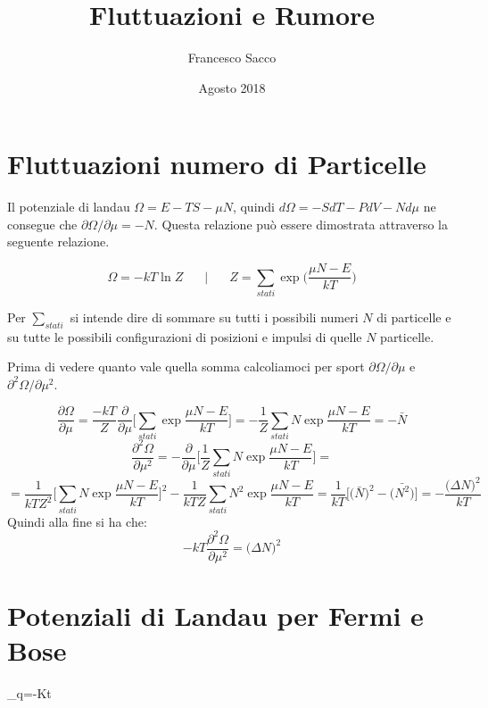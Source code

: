 \documentclass[10pt,a4paper]{article}
\author{Francesco Sacco}
\title{Fluttuazioni e Rumore}
\newcommand{\exn}{\phantom{xxx}}
\begin{document}
\date{Agosto 2018}
\maketitle

\section{Fluttuazioni numero di Particelle}
	Il potenziale di landau $\Omega=E-TS-\mu N$, quindi $d\Omega=-SdT-PdV-Nd\mu$ ne consegue che $\partial \Omega/\partial \mu=-N$. Questa relazione può essere dimostrata attraverso la seguente relazione.

	\begin{equation}
		\Omega=-kT\ln Z\exn|\exn Z=\sum_{stati}\exp\bigg(\frac{\mu N -E}{kT}\bigg)
	\end{equation}

	Per $\sum_{stati}$ si intende dire di sommare su tutti i possibili numeri $N$ di particelle e su tutte le possibili configurazioni di posizioni e impulsi di quelle $N$ particelle.\newline

	Prima di vedere quanto vale quella somma calcoliamoci per sport $\partial \Omega/\partial \mu$ e $\partial^2 \Omega/\partial \mu^2$.

	\[
		\frac{\partial \Omega}{\partial \mu}=\frac{-kT}{Z}\frac{\partial}{\partial \mu}
		\bigg[\sum_{stati}\exp\frac{\mu N -E}{kT}\bigg]=-\frac1Z \sum_{stati}N\exp\frac{\mu N -E}{kT}=-\bar N
	\]\newline\newline
	\[
		\frac{\partial^2 \Omega}{\partial \mu^2}=
		-\frac{\partial}{\partial \mu}\bigg[\frac1Z \sum_{stati}N\exp\frac{\mu N -E}{kT}\bigg]=
	\]
	\[
		=\frac1{kTZ^2}\bigg[\sum_{stati}N\exp\frac{\mu N -E}{kT}\bigg]^2-\frac1{kTZ}\sum_{stati}N^2\exp\frac{\mu N -E}{kT}=\frac1{kT}\bigg[\big(\bar N\big)^2-\bar{\big(N^2\big)}\bigg]=-\frac{\big(\Delta N\big)^2}{kT}
	\]
	Quindi alla fine si ha che:
	\begin{equation}
		-kT\frac{\partial^2 \Omega}{\partial \mu^2}=\big(\Delta N\big)^2
	\end{equation}


\section{Potenziali di Landau per Fermi e Bose}

	\Omega_q=-Kt\ln
\end{document}

